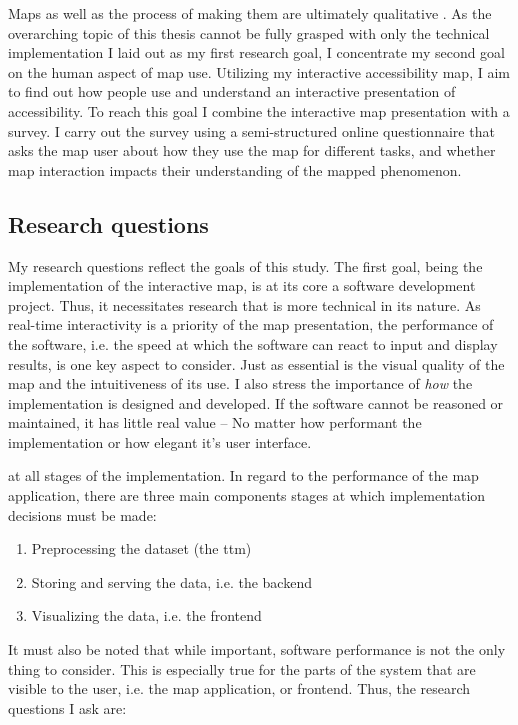 Maps as well as the process of making them are ultimately qualitative
\parencite{cop2009}.
As the overarching topic of this thesis
cannot be fully grasped with only the technical implementation
I laid out as my first research goal,
I concentrate my second goal on the human aspect of map use.
Utilizing my interactive accessibility map,
I aim to find out how
people use and understand an interactive presentation of accessibility.
To reach this goal I combine
the interactive map presentation with a survey.
I carry out the survey using a semi-structured online questionnaire
that asks the map user about how they use the map for different tasks,
and whether map interaction impacts their understanding of the mapped phenomenon.

\subsection{Research questions}

My research questions reflect the goals of this study.  %
The first goal, being the implementation of the interactive map,
is at its core a software development project.
Thus, it necessitates research that is more technical in its nature.
As real-time interactivity is a priority of the map presentation,
the performance of the software,
i.e. the speed at which the software can react to input and display results,
is one key aspect to consider.
Just as essential is the visual quality of the map
and the intuitiveness of its use.
I also stress the importance of \textit{how} the implementation is designed and developed.
If the software cannot be reasoned or maintained, it has little real value --
No matter how performant the implementation or how elegant it's user interface.


at all stages of the implementation.
In regard to the performance of the map application,
there are three main components stages at which implementation decisions must be made:  %
\begin{enumerate}
	\item Preprocessing the dataset (the \acrlong{ttm})
	\item Storing and serving the data, i.e. the backend
	\item Visualizing the data, i.e. the frontend
\end{enumerate}

It must also be noted that while important,
software performance is not the only thing to consider.
This is especially true for the parts of the system
that are visible to the user, i.e. the map application, or frontend.
Thus, the research questions I ask are:

